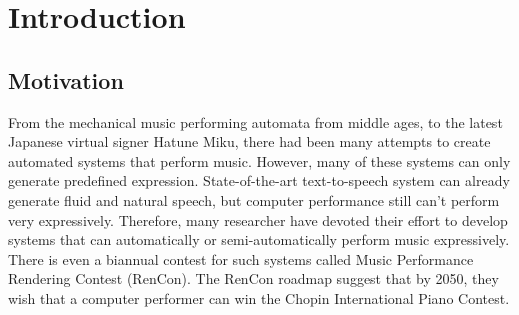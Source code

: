 \chapter{Introduction}
\section{Motivation}
From the mechanical music performing automata from middle ages, to the latest Japanese virtual signer Hatune Miku, there had been many attempts to create automated systems that perform music. However, many of these systems can only generate predefined expression. State-of-the-art text-to-speech system can already generate fluid and natural speech, but computer performance still can't perform very expressively. Therefore, many researcher have devoted their effort to develop systems that can automatically or semi-automatically perform music expressively. There is even a biannual contest for such systems called Music Performance Rendering Contest (RenCon)\cite{RenCon}. The RenCon roadmap suggest that by 2050, they wish that a computer performer can win the Chopin International Piano Contest.



